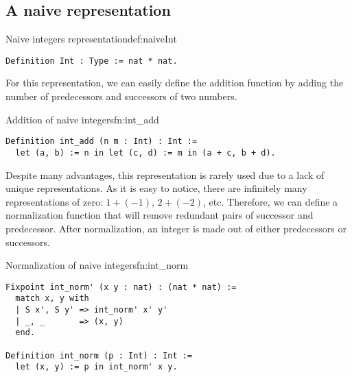\subsection{A naive representation}
\begin{defi}{Naive integers representation}{def:naiveInt}
\begin{verbatim}
Definition Int : Type := nat * nat.
\end{verbatim}
\end{defi}
For this representation, we can easily define the addition function by adding the number of predecessors and successors of two numbers.
\begin{func}{Addition of naive integers}{fn:int_add}
\begin{verbatim}
Definition int_add (n m : Int) : Int :=
  let (a, b) := n in let (c, d) := m in (a + c, b + d).
\end{verbatim}
\end{func}
Despite many advantages, this representation is rarely used due to a lack of unique representations. As it is easy to notice, there are infinitely many representations of zero: $1 + (-1)$, $2 + (-2)$, etc. Therefore, we can define a normalization function that will remove redundant pairs of successor and predecessor. After normalization, an integer is made out of either predecessors or successors.
\begin{func}{Normalization of naive integers}{fn:int_norm}
\begin{verbatim}
Fixpoint int_norm' (x y : nat) : (nat * nat) :=
  match x, y with
  | S x', S y' => int_norm' x' y'
  | _, _       => (x, y)
  end.

Definition int_norm (p : Int) : Int := 
  let (x, y) := p in int_norm' x y.
\end{verbatim}
\end{func}
